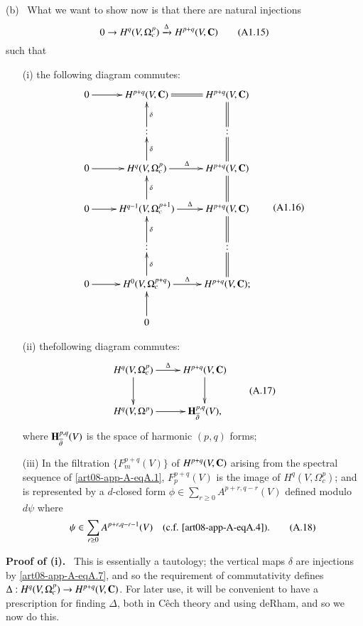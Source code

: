 (b)~ What we want to show now is that there are natural injections
\begin{equation*}
0\to H^{q}(V,\Omega^{p}_{c})\xrightarrow{\Delta}H^{p+q}(V,\mathbf{C})\tag{A1.15}\label{art08-app-A-eqA.15} 
\end{equation*}
such that
\begin{itemize}
\item[(i)] the following diagram commutes:
\begin{equation*}
\vcenter{\xymatrix{
0\ar[r] & H^{p+q}(V,\bfC)\ar@{=}[r] & H^{p+q}(V,\bfC)\\
 & :\ar[u]_-{\delta} & :\ar@{=}[u]\\
0\ar[r] & H^{q}(V,\Omega^{p}_{c})\ar[u]_-{\delta} \ar[r]^{\Delta} & H^{p+q}(V,\bfC)\ar@{=}[u]\\
0\ar[r] & H^{q-1}(V,\Omega^{p+1}_{c})\ar[u]_-{\delta}\ar[r]^-{\Delta} & H^{p+q}(V,\bfC)\ar@{=}[u]\\
 & :\ar[u]_-{\delta} & :\ar@{=}[u]\\
0\ar[r] & H^{0}(V,\Omega^{p+q}_{c})\ar[u]_-{\delta}\ar[r]^-{\Delta} & H^{p+q}(V,\bfC);\ar@{=}[u]\\
 & 0\ar[u] & 
}}\tag{A1.16}\label{art08-app-A-eqA.16} 
\end{equation*}

\item[(ii)] the\pageoriginale following diagram commutes:
\begin{equation*}
\vcenter{\xymatrix{
H^{q}(V,\Omega^{p}_{c})\ar[d]\ar[r]^-{\Delta} & H^{p+q}(V,\bfC)\ar[d]\\
H^{q}(V,\Omega^{p})\ar[r] & \bfH^{p,q}_{\overline{\partial}}(V),
}}\tag{A.17}\label{art08-app-A-eqA.17} 
\end{equation*}
where $\mathbf{H}^{p,q}_{\overline{\partial}}(V)$ is the space of harmonic $(p,q)$ forms;

\item[(iii)] In the filtration $\{F^{p+q}_{m}(V)\}$ of $H^{p+q}(V,\mathbf{C})$ arising from the spectral sequence of \eqref{art08-app-A-eqA.1}, $F^{p+q}_{p}(V)$ is the image of $H^{q}(V,\Omega^{p}_{c})$; and is represented by a $d$-closed form $\phi\in \sum\limits_{r\geq 0}A^{p+r,q-r}(V)$ defined modulo $d\psi$ where 
\begin{equation*}
\psi\in \sum\limits_{r\geq 0}A^{p+r,q-r-1}(V)\quad\text{(c.f. \eqref{art08-app-A-eqA.4}).}\tag{A.18}\label{art08-app-A-eqA.18}
\end{equation*}
\end{itemize}

\noindent
{\bf Proof of (i).}~ This is essentially a tautology; the vertical maps $\delta$ are injections by \eqref{art08-app-A-eqA.7}, and so the requirement of commutativity defines $\Delta : H^{q}(V,\Omega^{p}_{c})\to H^{p+q}(V,\mathbf{C})$. For later use, it will be convenient to have a prescription for finding $\Delta$, both in C\^ech theory and using deRham, and so we now do this.


